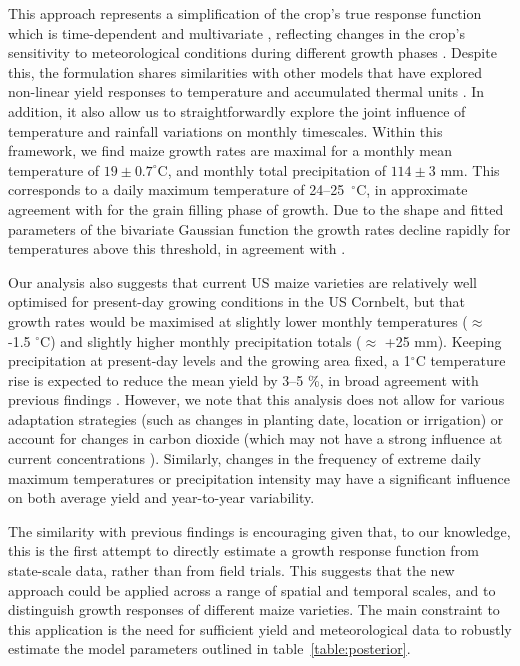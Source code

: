 \documentclass[12pt]{article}
\begin{document}
This approach represents a simplification of the crop's true response function which is time-dependent and multivariate \citep[e.g.][]{siebert:2017}, reflecting changes in the crop's sensitivity to meteorological conditions during different growth phases \citep[e.g.][]{hatfield:2011, sanchez:2014}. Despite this, the formulation shares similarities with other models that have explored non-linear yield responses to temperature and accumulated thermal units \citep[e.g.][]{lobell:2013, zhou:2018}. In addition, it also allow us to straightforwardly explore the joint influence of temperature and rainfall variations on monthly timescales. Within this framework, we find maize growth rates are maximal for a monthly mean temperature of $19 \pm 0.7 ^\circ$C, and monthly total precipitation of $ 114 \pm 3$ mm. This corresponds to a daily maximum temperature of 24--25~$^\circ$C, in approximate agreement with \cite{sanchez:2014, hatfield:2015} for the grain filling phase of growth. Due to the shape and fitted parameters of the bivariate Gaussian function the growth rates decline rapidly for temperatures above this threshold, in agreement with \cite{schlenker:2009}. 

Our analysis also suggests that current US maize varieties are relatively well optimised for present-day growing conditions in the US Cornbelt, but that growth rates would be maximised at slightly lower monthly temperatures ($\approx$ -1.5 $^\circ$C) and slightly higher monthly precipitation totals ($\approx$ +25 mm). Keeping precipitation at present-day levels and the growing area fixed, a 1$^\circ$C temperature rise is expected to reduce the mean yield by 3--5 \%, in broad agreement with previous findings \citep[e.g.][]{bassu:2014, urban:2015, lobell:2017}. However, we note that this analysis does not allow for various adaptation strategies (such as changes in planting date, location or irrigation) or account for changes in carbon dioxide (which may not have a strong influence at current concentrations \citep[e.g.][]{leakey:2009}). Similarly, changes in the frequency of extreme daily maximum temperatures or precipitation intensity may have a significant influence on both average yield and year-to-year variability. 

The similarity with previous findings is encouraging given that, to our knowledge, this is the first attempt to directly estimate a growth response function from state-scale data, rather than from field trials. This suggests that the new approach could be applied across a range of spatial and temporal scales, and to distinguish growth responses of different maize varieties. The main constraint to this application is the need for sufficient yield and meteorological data to robustly estimate the model parameters outlined in table~\ref{table:posterior}.  
\end{document}
